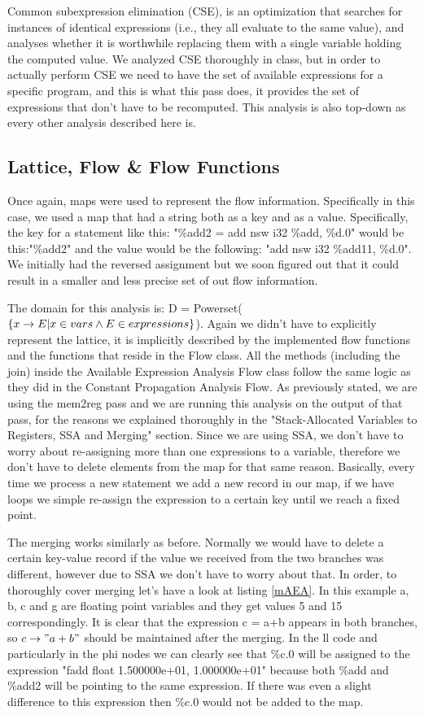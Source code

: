Common subexpression elimination (CSE), is an optimization that searches for instances of identical expressions (i.e., they all evaluate to the same value), and analyses whether it is worthwhile replacing them with a single variable holding the computed value. We analyzed CSE thoroughly in class, but in order to actually perform CSE we need to have the set of available expressions for a specific program, and this is what this pass does, it provides the set of expressions that don't have to be recomputed. This analysis is also top-down as every other analysis described here is.


\subsection*{Lattice, Flow \& Flow Functions}

Once again, maps were used to represent the flow information. Specifically in this case, we used a map that had a string both as a key and as a value. Specifically, the key for a statement like this: "\%add2 = add nsw i32 \%add, \%d.0" would be this:"\%add2" and the value would be the following: "add nsw i32 \%add11, \%d.0". We initially had the reversed assignment but we soon figured out that it could result in a smaller and less precise set of out flow information.

The domain for this analysis is: D = Powerset($\{x\rightarrow E|x\in vars \wedge E\in expressions\}$). Again we didn't have to explicitly represent the lattice, it is implicitly described by the implemented flow functions and the functions that reside in the Flow class. All the methods (including the join) inside the Available Expression Analysis Flow class follow the same logic as they did in the Constant Propagation Analysis Flow. As previously stated, we are using the mem2reg pass and we are running this analysis on the output of that pass, for the reasons we explained thoroughly in the "Stack-Allocated Variables to Registers, SSA and Merging" section. Since we are using SSA, we don't have to worry about re-assigning more than one expressions to a variable, therefore we don't have to delete elements from the map for that same reason. Basically, every time we process a new statement we add a new record in our map, if we have loops we simple re-assign the expression to a certain key until we reach a fixed point.



The merging works similarly as before. Normally we would have to delete a certain key-value record if the value we received from the two branches was different, however due to SSA we don't have to worry about that. In order, to thoroughly cover merging let's have a look at listing \ref{mAEA}. In this example a, b, c and g are floating point variables and they get values 5 and 15 correspondingly. It is clear that the expression c = a+b appears in both branches, so $c\rightarrow"a+b"$ should be maintained after the merging. In the ll code and particularly in the phi nodes we can clearly see that \%c.0 will be assigned to the expression "fadd float 1.500000e+01, 1.000000e+01" because both \%add and \%add2 will be pointing to the same expression. If there was even a slight difference to this expression then \%c.0 would not be added to the map.


